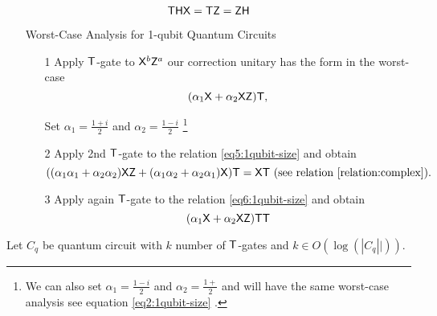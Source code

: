  \begin{equation}
 \label{eq4:1qubit-size}
{\sf T}{\sf H} {\sf X}={\sf T} {\sf Z}={\sf Z} {\sf H}
\end{equation}
 
 
 \begin{itemize}
 \item[] Worst-Case Analysis for 1-qubit Quantum Circuits
 \begin{itemize}
 \item[1] Apply ${\sf T}$-gate to ${\sf X}^b {\sf Z}^a$ our correction unitary has the form in the worst-case
 \begin{equation}
 \label{eq5:1qubit-size}
(\alpha_1 {\sf X} +\alpha_2 {\sf X}{\sf Z}){\sf T}, 
\end{equation}
\item[] Set $\alpha_1=\frac{1+i}{2}$ and $\alpha_2=\frac{1-i}{2}$ \footnote{We can also set $\alpha_1=\frac{1-i}{2}$ and $\alpha_2=\frac{1+}{2}$ and will have the same worst-case analysis see equation \ref{eq2:1qubit-size} .}
\item[2] Apply 2nd ${\sf T}$-gate to the relation \ref{eq5:1qubit-size} and obtain
\begin{equation}
 \label{eq6:1qubit-size}
((\alpha_1\alpha_1+\alpha_2\alpha_2) {\sf X}{\sf Z} +(\alpha_1\alpha_2+\alpha_2\alpha_1) {\sf X}){\sf T}={\sf X}{\sf T}  \mbox{ (see relation  \ref{relation:complex})}.
\end{equation}
\item[3] Apply again ${\sf T}$-gate to the relation \ref{eq6:1qubit-size} and obtain
\begin{equation}
 \label{eq7:1qubit-size}
 (\alpha_1 {\sf X} +\alpha_2 {\sf X}{\sf Z}){\sf T}{\sf T}
\end{equation}
  \end{itemize}
 \end{itemize} 
 
%
 Let $C_q$ be  quantum circuit with $k$ number of ${\sf T}$-gates and $k\in O(\log(|C_q||)).$ 
 
